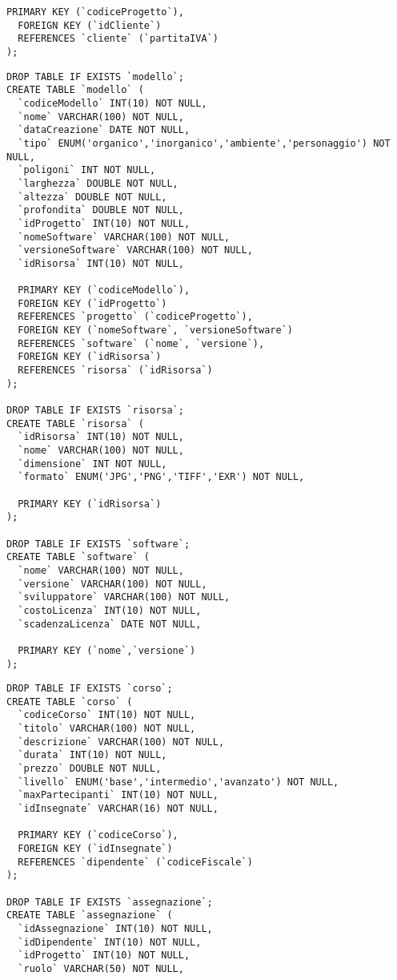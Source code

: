 \documentclass[a4paper,11pt]{article}
\begin{document}
{\begin{lstlisting}[style=SQL]
  PRIMARY KEY (`codiceProgetto`),
  FOREIGN KEY (`idCliente`)
  REFERENCES `cliente` (`partitaIVA`)
);
\end{lstlisting}
\newpage
\begin{lstlisting}[style=SQL]
DROP TABLE IF EXISTS `modello`;
CREATE TABLE `modello` (
  `codiceModello` INT(10) NOT NULL,
  `nome` VARCHAR(100) NOT NULL,
  `dataCreazione` DATE NOT NULL,
  `tipo` ENUM('organico','inorganico','ambiente','personaggio') NOT NULL,
  `poligoni` INT NOT NULL,
  `larghezza` DOUBLE NOT NULL,
  `altezza` DOUBLE NOT NULL,
  `profondita` DOUBLE NOT NULL,
  `idProgetto` INT(10) NOT NULL,
  `nomeSoftware` VARCHAR(100) NOT NULL,
  `versioneSoftware` VARCHAR(100) NOT NULL,
  `idRisorsa` INT(10) NOT NULL,
  
  PRIMARY KEY (`codiceModello`),
  FOREIGN KEY (`idProgetto`)
  REFERENCES `progetto` (`codiceProgetto`),
  FOREIGN KEY (`nomeSoftware`, `versioneSoftware`)
  REFERENCES `software` (`nome`, `versione`),
  FOREIGN KEY (`idRisorsa`)
  REFERENCES `risorsa` (`idRisorsa`)
);

DROP TABLE IF EXISTS `risorsa`;
CREATE TABLE `risorsa` (
  `idRisorsa` INT(10) NOT NULL,
  `nome` VARCHAR(100) NOT NULL,
  `dimensione` INT NOT NULL,
  `formato` ENUM('JPG','PNG','TIFF','EXR') NOT NULL,

  PRIMARY KEY (`idRisorsa`)
);

DROP TABLE IF EXISTS `software`;
CREATE TABLE `software` (
  `nome` VARCHAR(100) NOT NULL,
  `versione` VARCHAR(100) NOT NULL,
  `sviluppatore` VARCHAR(100) NOT NULL,
  `costoLicenza` INT(10) NOT NULL,
  `scadenzaLicenza` DATE NOT NULL,
  
  PRIMARY KEY (`nome`,`versione`)
);
\end{lstlisting}
\newpage
\begin{lstlisting}[style=SQL]
DROP TABLE IF EXISTS `corso`;
CREATE TABLE `corso` (
  `codiceCorso` INT(10) NOT NULL,
  `titolo` VARCHAR(100) NOT NULL,
  `descrizione` VARCHAR(100) NOT NULL,
  `durata` INT(10) NOT NULL,
  `prezzo` DOUBLE NOT NULL,
  `livello` ENUM('base','intermedio','avanzato') NOT NULL,
  `maxPartecipanti` INT(10) NOT NULL,
  `idInsegnate` VARCHAR(16) NOT NULL,
  
  PRIMARY KEY (`codiceCorso`),
  FOREIGN KEY (`idInsegnate`)
  REFERENCES `dipendente` (`codiceFiscale`)
);

DROP TABLE IF EXISTS `assegnazione`;
CREATE TABLE `assegnazione` (
  `idAssegnazione` INT(10) NOT NULL,
  `idDipendente` INT(10) NOT NULL,
  `idProgetto` INT(10) NOT NULL,
  `ruolo` VARCHAR(50) NOT NULL,
  

\end{lstlisting}}
\end{document}
